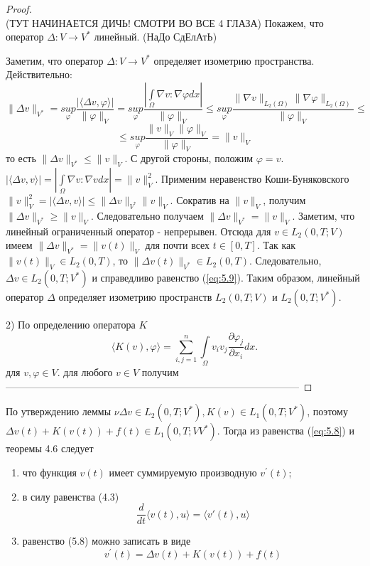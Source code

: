 \begin{proof} ~\\ (ТУТ НАЧИНАЕТСЯ ДИЧЬ! СМОТРИ ВО ВСЕ 4 ГЛАЗА)
        Покажем, что оператор $\Delta : V\rightarrow V^*$ линейный. (НаДо СдЕлАтЬ)

        Заметим, что оператор $\Delta : V\rightarrow V^*$ определяет изометрию пространства. Действительно:
        $$\| \Delta v \|_{V^*}=\underset{\varphi}{sup} \frac{|\langle \Delta v,\varphi \rangle|}{\| \varphi\|_V}=\underset{\varphi}{sup} 
        \frac{|\int\limits_{\Omega}\nabla v:\nabla\varphi dx|}{\| \varphi\|_V}\le
        \underset{\varphi}{sup} \frac{\|\nabla v\|_{L_2(\Omega)}\|\nabla \varphi\|_{L_2(\Omega)}}{\|\varphi\|_V}\le$$
        $$\le\underset{\varphi}{sup} \frac{\| v \|_{V} \| \varphi \|_{V}}{\| \varphi \|_{V}}=\| v \|_{V}$$
        то есть $\| \Delta v \|_{V^*}\le\| v \|_{V}.$ С другой стороны, положим $\varphi=v.$
        $|\langle \Delta v,v \rangle|=|\int\limits_{\Omega}\nabla v:\nabla v dx|=\|v\|_V^2.$
        Применим неравенство Коши-Буняковского $\|v\|_V^2=|\langle \Delta v,v\rangle|\le\|\Delta v\|_{V^*}\| v\|_{V}.$
        Сократив на $\|v\|_V$, получим $\|\Delta v\|_{V^*}\ge\|v\|_V.$
        Следовательно получаем $\|\Delta v\|_{V^*}=\|v\|_V.$
        Заметим, что линейный ограниченный оператор - непрерывен.
        Отсюда для $v \in L_2(0, T; V)$ имеем
         $\| \Delta v \|_{V^\ast} = \| v(t) \|_V$ для почти всех \linebreak$t \in [0, T]$.
        Так как $\| v(t) \|_V \in L_2(0, T)$,
        то $\| \Delta v(t)\|_{V^*} \in L_2(0, T)$. Следовательно, $\Delta v \in L_2(0, T; V^\ast)$ и справедливо
        равенство (\ref{eq:5.9}). Таким образом, линейный оператор $\Delta$ определяет изометрию пространств $L_2(0, T; V)$ и $L_2(0, T; V^\ast)$.
        
        2) По определению оператора $K$
        $$\langle K(v),\varphi \rangle = \sum_{i,j=1}^{n}\int\limits_\Omega v_i v_j \frac{\partial \varphi_j}{\partial x_i}dx.$$
        для $v,\varphi\in V.$ для любого $v\in V$ получим
-----------------------------------------------------------------------------------------
\end{proof}

По утверждению леммы $\nu\Delta v \in L_2(0, T; V^\ast), K(v) \in L_1(0, T; V^\ast)$, поэтому $\Delta v(t) + K(v(t)) + f(t) \in L_1(0, T; VV^\ast)$.
Тогда из равенства (\ref{eq:5.8}) и теоремы 4.6 следует
\begin{enumerate}
    \item что функция $v(t)$ имеет суммируемую производную $v^\prime(t)$;
    \item в силу равенства (4.3)
    $$\frac{d}{dt} \langle v(t), u \rangle = \langle v'(t), u \rangle $$
    \item равенство (5.8) можно записать в виде
    $$v^\prime(t)=\Delta v(t)+K(v(t))+f(t)$$
\end{enumerate}

